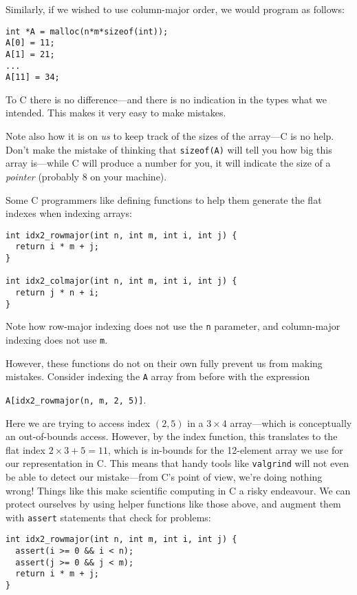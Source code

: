 Similarly, if we wished to use column-major order, we would program as
follows:

\begin{lstlisting}
int *A = malloc(n*m*sizeof(int));
A[0] = 11;
A[1] = 21;
...
A[11] = 34;
\end{lstlisting}

To C there is no difference---and there is no indication in the types
what we intended.  This makes it very easy to make mistakes.

Note also how it is on \textit{us} to keep track of the sizes of the
array---C is no help.  Don't make the mistake of thinking that
\lstinline{sizeof(A)} will tell you how big this array is---while C
will produce a number for you, it will indicate the size of a
\textit{pointer} (probably 8 on your machine).

Some C programmers like defining functions to help them generate the
flat indexes when indexing arrays:

\begin{lstlisting}
int idx2_rowmajor(int n, int m, int i, int j) {
  return i * m + j;
}

int idx2_colmajor(int n, int m, int i, int j) {
  return j * n + i;
}
\end{lstlisting}

Note how row-major indexing does not use the \texttt{n} parameter, and
column-major indexing does not use \texttt{m}.

However, these functions do not on their own fully prevent us from
making mistakes.  Consider indexing the \texttt{A} array from before
with the expression

\begin{center}
\lstinline{A[idx2_rowmajor(n, m, 2, 5)]}.
\end{center}

Here we are trying to access index $(2,5)$ in a $3\times{}4$
array---which is conceptually an out-of-bounds access.  However, by
the index function, this translates to the flat index
$2\times{}3+5=11$, which is in-bounds for the 12-element array we use
for our representation in C.  This means that handy tools like
\texttt{valgrind} will not even be able to detect our mistake---from
C's point of view, we're doing nothing wrong!  Things like this make
scientific computing in C a risky endeavour.  We can protect ourselves
by using helper functions like those above, and augment them with
\texttt{assert} statements that check for problems:

\begin{lstlisting}
int idx2_rowmajor(int n, int m, int i, int j) {
  assert(i >= 0 && i < n);
  assert(j >= 0 && j < m);
  return i * m + j;
}
\end{lstlisting}


